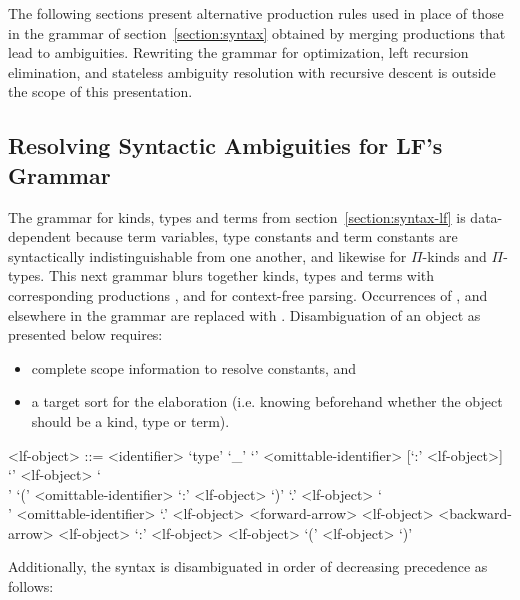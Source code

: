 The following sections present alternative production rules used in place of those in the grammar of section~\ref{section:syntax} obtained by merging productions that lead to ambiguities.
Rewriting the grammar for optimization, left recursion elimination, and stateless ambiguity resolution with recursive descent is outside the scope of this presentation.

\subsection{Resolving Syntactic Ambiguities for \acs{LF}'s Grammar}\label{section:blurred-lf-syntax}

The grammar for \LF kinds, types and terms from section~\ref{section:syntax-lf} is data-dependent because \LF term variables, type constants and term constants are syntactically indistinguishable from one another, and likewise for $ \Pi $-kinds and $ \Pi $-types.
This next grammar blurs together \LF kinds, types and terms with corresponding productions ,  and  for context-free parsing.
Occurrences of ,  and  elsewhere in the grammar are replaced with .
Disambiguation of an \LF object as presented below requires:
\begin{itemize}
\item complete scope information to resolve constants, and
\item a target sort for the elaboration (i.e. knowing beforehand whether the \LF object should be a kind, type or term).
\end{itemize}

\begin{grammar}
<lf-object> ::= <identifier>
\alt `type'
\alt `_'
\alt `{' <omittable-identifier> [`:' <lf-object>] `}' <lf-object>
\alt `\\' `(' <omittable-identifier> `:' <lf-object> `)' `.' <lf-object>
\alt `\\' <omittable-identifier> `.' <lf-object>
 <forward-arrow> <lf-object>
 <backward-arrow> <lf-object>
 `:' <lf-object>
 <lf-object>
\alt `(' <lf-object> `)'
\end{grammar}

Additionally, the syntax is disambiguated in order of decreasing precedence as follows:

